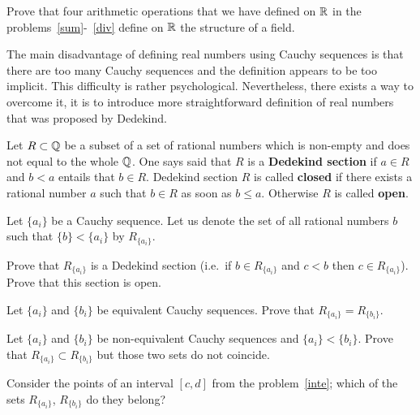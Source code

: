\documentclass[12pt]{article}
\begin{document}
\begin{zadacha}[!] Prove that four arithmetic operations that we have
  defined on ${\mathbb R}$ in the problems~\ref{sum}-~\ref{div} define on ${\mathbb R}$
  the structure of a field.
\end{zadacha}


The main disadvantage of defining real numbers using Cauchy sequences
is that there are too many Cauchy sequences and the definition appears
to be too implicit. This difficulty is rather
psychological. Nevertheless, there exists a way to overcome it, it is
to introduce more straightforward definition of real numbers that was
proposed by Dedekind.

\begin{opredelenie}
Let $R \subset {\mathbb Q}$ be a subset of a set of rational numbers which is
non-empty and does not equal to the whole ${\mathbb Q}$. One says said that $R$ is
a {\bf Dedekind section} if $a \in R$ and $b < a$ entails that $b \in
R$. Dedekind section $R$ is called {\bf closed} if there exists a
rational number $a$ such that $b \in R$ as soon as $b \leq
a$. Otherwise $R$ is called {\bf open}.
\end{opredelenie}

Let $\{a_i\}$ be a Cauchy sequence. Let us denote the set of all
rational numbers $b$ such that $\{b\} < \{a_i\}$ by $R_{\{a_i\}}$.

\begin{zadacha}
Prove that $R_{\{a_i\}}$ is a Dedekind section (i.e.\ if $b \in
R_{\{a_i\}}$ and $c < b$ then $c \in R_{\{a_i\}}$). Prove that this
section is open.
\end{zadacha}

\begin{zadacha} Let $\{ a_i\}$ and $\{b_i\}$ be equivalent Cauchy
  sequences. Prove that $R_{\{a_i\}} = R_{\{b_i\}}$.
\end{zadacha}

\begin{zadacha}
Let $\{ a_i\}$ and $\{b_i\}$ be non-equivalent Cauchy sequences and
$\{a_i\} < \{b_i\}$. Prove that $R_{\{a_i\}} \subset
R_{\{b_i\}}$ but those two sets do not coincide.
\end{zadacha}

\begin{ukazanie}
Consider the points of an interval $[c,d]$ from the
problem~\ref{inte}; which of the sets $R_{\{a_i\}}$, $R_{\{b_i\}}$ do
they belong?
\end{ukazanie}
 
\end{document}
